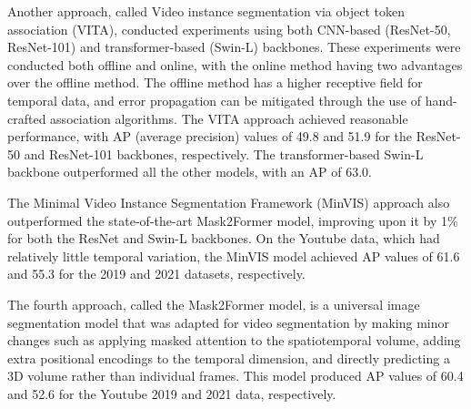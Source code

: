 	Another approach, called Video instance segmentation via object token association (VITA), conducted experiments using both CNN-based (ResNet-50, ResNet-101) and transformer-based (Swin-L) backbones. These experiments were conducted both offline and online, with the online method having two advantages over the offline method. The offline method has a higher receptive field for temporal data, and error propagation can be mitigated through the use of hand-crafted association algorithms. The VITA approach achieved reasonable performance, with AP (average precision) values of 49.8 and 51.9 for the ResNet-50 and ResNet-101 backbones, respectively. The transformer-based Swin-L backbone outperformed all the other models, with an AP of 63.0.
	
	The Minimal Video Instance Segmentation Framework (MinVIS) approach also outperformed the state-of-the-art Mask2Former model, improving upon it by 1\% for both the ResNet and Swin-L backbones. On the Youtube data, which had relatively little temporal variation, the MinVIS model achieved AP values of 61.6 and 55.3 for the 2019 and 2021 datasets, respectively.
	
	The fourth approach, called the Mask2Former model, is a universal image segmentation model that was adapted for video segmentation by making minor changes such as applying masked attention to the spatiotemporal volume, adding extra positional encodings to the temporal dimension, and directly predicting a 3D volume rather than individual frames. This model produced AP values of 60.4 and 52.6 for the Youtube 2019 and 2021 data, respectively. 
    
